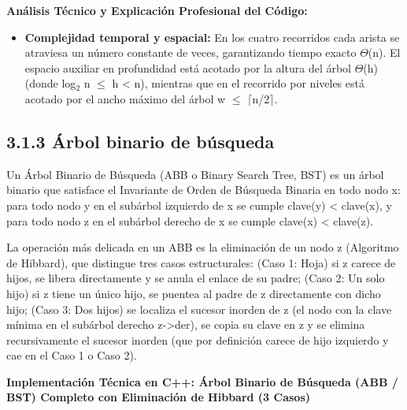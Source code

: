 \documentclass[11pt,letterpaper]{article}
\begin{document}
\noindent\textbf{\color{ipnguinda}Análisis Técnico y Explicación Profesional del Código:}\par\vspace{-2pt}
\begin{itemize}
\setlength{\itemsep}{2pt}\setlength{\parskip}{0pt}
  \item \textbf{Complejidad temporal y espacial: }En los cuatro recorridos cada arista se atraviesa un número constante de veces, garantizando tiempo exacto $\Theta$(n). El espacio auxiliar en profundidad está acotado por la altura del árbol $\Theta$(h) (donde log$_2$ n $\le$ h < n), mientras que en el recorrido por niveles está acotado por el ancho máximo del árbol w $\le$ $\lceil$n/2$\rceil$.
\end{itemize}
\subsection*{3.1.3 Árbol binario de búsqueda}
Un Árbol Binario de Búsqueda (ABB o Binary Search Tree, BST) es un árbol binario que satisface el Invariante de Orden de Búsqueda Binaria en todo nodo x: para todo nodo y en el subárbol izquierdo de x se cumple clave(y) < clave(x), y para todo nodo z en el subárbol derecho de x se cumple clave(x) < clave(z).\par
La operación más delicada en un ABB es la eliminación de un nodo z (Algoritmo de Hibbard), que distingue tres casos estructurales: (Caso 1: Hoja) si z carece de hijos, se libera directamente y se anula el enlace de su padre; (Caso 2: Un solo hijo) si z tiene un único hijo, se puentea al padre de z directamente con dicho hijo; (Caso 3: Dos hijos) se localiza el sucesor inorden de z (el nodo con la clave mínima en el subárbol derecho z->der), se copia su clave en z y se elimina recursivamente el sucesor inorden (que por definición carece de hijo izquierdo y cae en el Caso 1 o Caso 2).\par
\vspace{4pt}\noindent\textbf{\color{ipnblue}Implementación Técnica en C++: Árbol Binario de Búsqueda (ABB / BST) Completo con Eliminación de Hibbard (3 Casos)}\par\vspace{-2pt}
\end{document}
